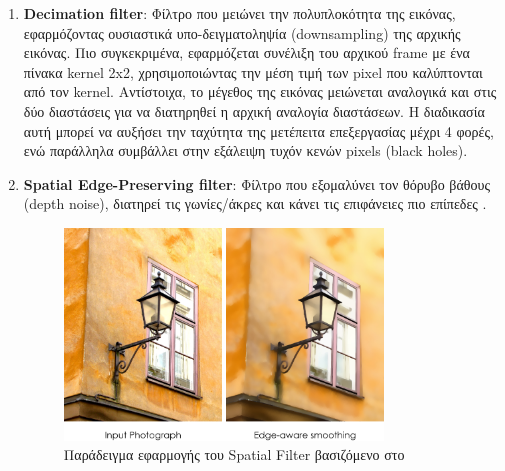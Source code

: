 \begin{enumerate}
    \item \textbf{Decimation filter}: Φίλτρο που μειώνει την πολυπλοκότητα της εικόνας, εφαρμόζοντας ουσιαστικά υπο-δειγματοληψία (downsampling) της αρχικής εικόνας. Πιο συγκεκριμένα, εφαρμόζεται συνέλιξη του αρχικού frame με ένα πίνακα kernel 2x2, χρησιμοποιώντας την μέση τιμή των pixel που καλύπτονται από τον kernel. Αντίστοιχα, το μέγεθος της εικόνας μειώνεται αναλογικά και στις δύο διαστάσεις για να διατηρηθεί η αρχική αναλογία διαστάσεων. Η διαδικασία αυτή μπορεί να αυξήσει την ταχύτητα της μετέπειτα επεξεργασίας μέχρι 4 φορές, ενώ παράλληλα συμβάλλει στην εξάλειψη τυχόν κενών pixels (black holes).
    \item \textbf{Spatial Edge-Preserving filter}: Φίλτρο που εξομαλύνει τον θόρυβο βάθους (depth noise), διατηρεί τις γωνίες/άκρες και κάνει τις επιφάνειες πιο επίπεδες \cite{GastalOliveira2011DomainTransform}.
    \begin{figure}[H]
        \centering
        \includegraphics[width=0.8\textwidth]{images/edge_preserving_example.png}
        \caption{Παράδειγμα εφαρμογής του Spatial Filter βασιζόμενο στο \cite{GastalOliveira2011DomainTransform}}
        \label{fig:spatial-example}
    \end{figure}


\end{enumerate}
